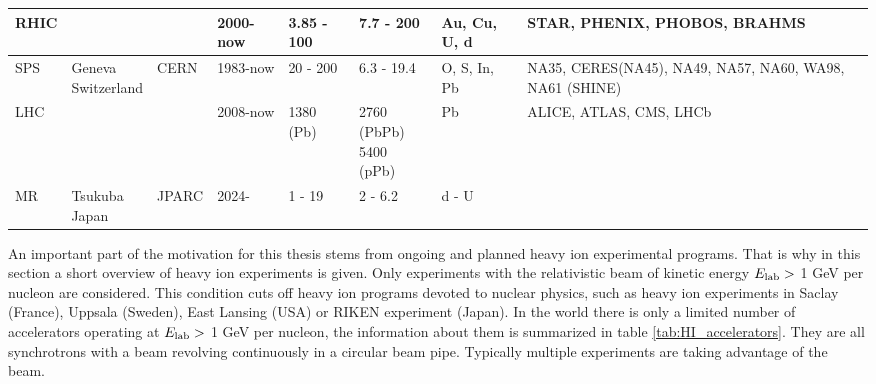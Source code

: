 \begin{table}
\begin{tabular}{llllllm{1cm}m{2cm}l}
  RHIC                              &                                 &              & 2000-now   & 3.85 - 100          & 7.7 - 200               & Au, Cu, U, d & STAR, PHENIX, PHOBOS, BRAHMS   & \cite{RHIC_lumi} \\
  \midrule
  SPS                               & \pbox{20cm}{Geneva\\Switzerland}& CERN         & 1983-now   & 20 - 200            & 6.3 - 19.4              & O, S, In, Pb & NA35, CERES(NA45), NA49, NA57, NA60, WA98, NA61 (SHINE) & \cite{cbm_physics_book,Pugh:1989eb} \\
  LHC                               &                                 &              & 2008-now   & 1380 (Pb)           & \pbox{20cm}{2760 (PbPb)\\5400 (pPb)} & Pb & ALICE, ATLAS, CMS, LHCb & \cite{Armesto:2015ioy} \\
  \midrule
  MR                                & \pbox{20cm}{Tsukuba\\Japan}     & JPARC        & 2024-      & 1 - 19              & 2 - 6.2                 & d - U        &   & \cite{Sako:2015cqa} \\
 \bottomrule
\end{tabular}
\end{table}

An important part of the motivation for this thesis stems from ongoing and
planned heavy ion experimental programs. That is why in this section a short overview
of heavy ion experiments is given. Only experiments with the relativistic beam of
kinetic energy $E_\mathrm{lab} > $ 1 GeV per nucleon are considered. This
condition cuts off heavy ion programs devoted to nuclear physics, such as heavy
ion experiments in Saclay (France), Uppsala (Sweden), East Lansing (USA) or
RIKEN experiment (Japan). In the world there is only a limited number of
accelerators operating at $E_\mathrm{lab} > $ 1 GeV per nucleon, the information
about them is summarized in table \ref{tab:HI_accelerators}. They are all
synchrotrons with a beam revolving continuously in a circular beam pipe.
Typically multiple experiments are taking advantage of the beam.

